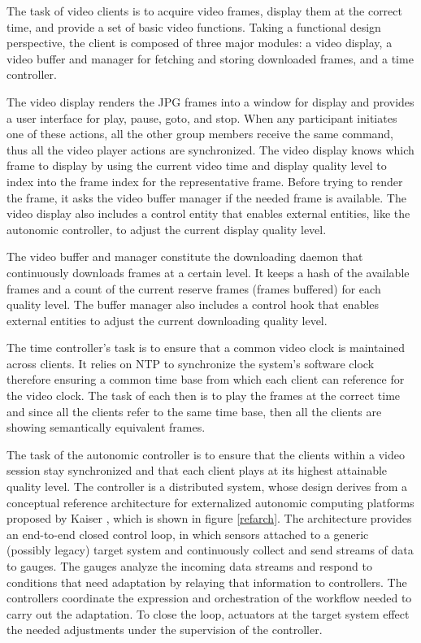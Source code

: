\documentclass{sig-alternate}
\begin{document}
The task of video clients is to acquire video frames, display them at
the correct time, and provide a set of basic video functions.  Taking
a functional design perspective, the client is composed of three major
modules: a video display, a video buffer and manager for fetching and
storing downloaded frames, and a time controller.

The video display renders the JPG frames into a window for display and
provides a user interface for play, pause, goto, and stop.  When any
participant initiates one of these actions, all the other group
members receive the same command, thus all the video player actions
are synchronized.  The video display knows which frame to display by
using the current video time and display quality level to index into
the frame index for the representative frame.  Before trying to render
the frame, it asks the video buffer manager if the needed frame is
available.  The video display also includes a control entity that
enables external entities, like the autonomic controller, to adjust
the current display quality level.

The video buffer and manager constitute the downloading daemon that
continuously downloads frames at a certain level.  It keeps a hash of
the available frames and a count of the current reserve frames (frames
buffered) for each quality level.  The buffer manager also includes a
control hook that enables external entities to adjust the current
downloading quality level.

The time controller's task is to ensure that a common video clock is
maintained across clients.  It relies on NTP \cite{NTP} to synchronize
the system's software clock therefore ensuring a common time base from
which each client can reference for the video clock.  The task of each
then is to play the frames at the correct time and since all the
clients refer to the same time base, then all the clients are showing
semantically equivalent frames.

The task of the autonomic controller is to ensure that the clients
within a video session stay synchronized and that each client plays at
its highest attainable quality level.  The controller is a distributed
system, whose design derives from a conceptual reference architecture
for externalized autonomic computing platforms proposed by Kaiser
\cite{REFARCH}, which is shown in figure \ref{refarch}. The
architecture provides an end-to-end closed control loop, in which
sensors attached to a generic (possibly legacy) target system and
continuously collect and send streams of data to gauges.  The gauges
analyze the incoming data streams and respond to conditions that need
adaptation by relaying that information to controllers.  The
controllers coordinate the expression and orchestration of the
workflow needed to carry out the adaptation.  To close the loop,
actuators at the target system effect the needed adjustments under the
supervision of the controller.
\end{document}
